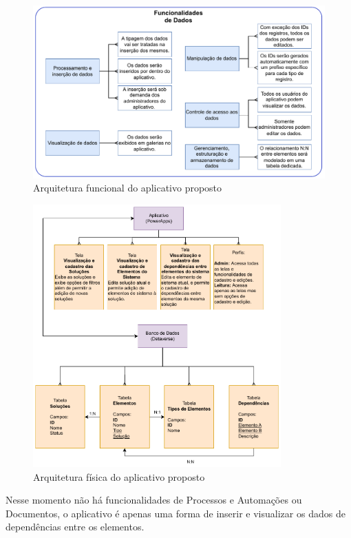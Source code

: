	\begin{figure}[!h]
		\centering
		\includegraphics[width=1\textwidth]{./figuras/appRastreabilidadeArqFunc.pdf}
		\caption{Arquitetura funcional do aplicativo proposto}
		\label{fig:metodologia:appRastreabilidadeArqFunc}
	\end{figure}
	
	\begin{figure}[!h]
		\centering
		\includegraphics[width=0.85\textwidth]{./figuras/appRastreabilidadeArqFis.pdf}
		\caption{Arquitetura física do aplicativo proposto}
		\label{fig:metodologia:appRastreabilidadeArqFis}
	\end{figure}

	Nesse momento não há funcionalidades de Processos e Automações ou Documentos, o aplicativo é apenas uma forma de inserir e visualizar os dados de dependências entre os elementos.

